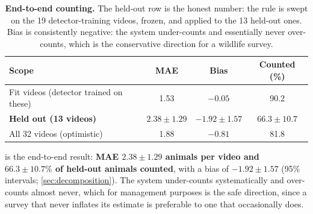 \begin{table}[H]
\caption{\textbf{End-to-end counting.} The held-out row is the honest number: the rule is
swept on the 19 detector-training videos, frozen, and applied to the 13 held-out ones. Bias is consistently negative: the system under-counts and essentially never over-counts, which
is the conservative direction for a wildlife survey.\label{tab:counting}}
\centering
\begin{tabularx}{\textwidth}{lCCC}
\toprule
\textbf{Scope} & \textbf{MAE} & \textbf{Bias} & \textbf{Counted (\%)} \\
\midrule
Fit videos (detector trained on these) & 1.53 & $-0.05$ & 90.2 \\
\textbf{Held out (13 videos)} & $\mathbf{2.38 \pm 1.29}$ & $\mathbf{-1.92 \pm 1.57}$ & $\mathbf{66.3 \pm 10.7}$ \\
All 32 videos (optimistic) & 1.88 & $-0.81$ & 81.8 \\
\bottomrule
\end{tabularx}
\end{table}

 is the end-to-end result: \textbf{MAE $2.38 \pm 1.29$ animals per video
and $66.3 \pm 10.7\%$ of held-out animals counted}, with a bias of $-1.92 \pm 1.57$
(95\% intervals; \cref{sec:decomposition}). The system under-counts systematically
and over-counts almost never, which for management purposes is the safe direction, since a survey that never inflates its estimate is preferable to one that occasionally does.

